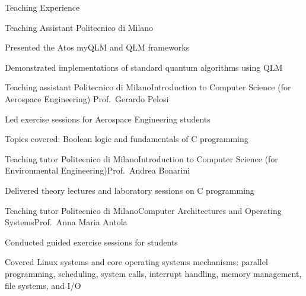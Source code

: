 \documentclass[
	a4paper, %
	10pt, %
]{tresume} %
\begin{document}
\begin{tSection}{Teaching Experience}
\begin{tSubsection}{Teaching Assistant \textemdash{} Politecnico di Milano}
\item Presented the Atos myQLM and QLM frameworks
\item Demonstrated implementations of standard quantum algorithms using QLM
\end{tSubsection}
  \begin{tSubsection}{Teaching assistant \textemdash{} Politecnico di
      Milano}{}{Introduction to Computer
      Science (for Aerospace Engineering) }{Prof.\ Gerardo Pelosi}
    \item Led exercise sessions for Aerospace Engineering students
    \item Topics covered: Boolean logic and fundamentals of C programming
  \end{tSubsection}
  \begin{tSubsection}{Teaching tutor \textemdash{} Politecnico di
      Milano}{}{Introduction to Computer
      Science (for Environmental Engineering)}{Prof.\ Andrea Bonarini}
    \item Delivered theory lectures and laboratory sessions on C programming
\end{tSubsection}
\begin{tSubsection}{Teaching tutor \textemdash{} Politecnico di Milano}{}{Computer
    Architectures and Operating Systems}{Prof.\ Anna Maria Antola}
  \item Conducted guided exercise sessions for students
  \item Covered Linux systems and core operating systems mechanisms:
      parallel programming, scheduling, system calls, interrupt handling,
      memory management, file systems, and I/O
\end{tSubsection}
\end{tSection}
\clearpage
\end{document}

